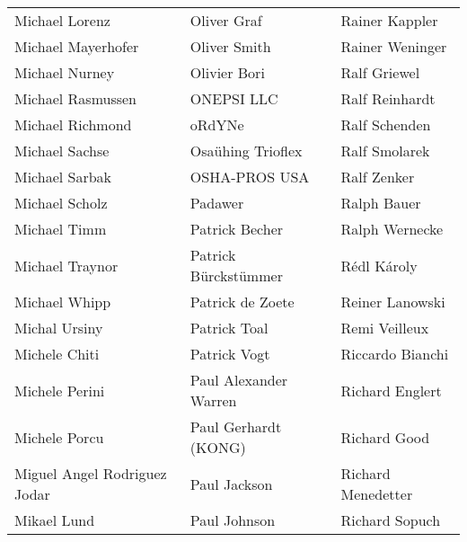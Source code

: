 \begin{tabular}{p{4.5cm}p{4.5cm}p{4.5cm}}
Michael Lorenz & Oliver Graf & Rainer Kappler \\
Michael Mayerhofer & Oliver Smith & Rainer Weninger \\
Michael Nurney & Olivier Bori & Ralf Griewel \\
Michael Rasmussen & ONEPSI LLC & Ralf Reinhardt \\
Michael Richmond & oRdYNe & Ralf Schenden \\
Michael Sachse & Osaühing Trioflex & Ralf Smolarek \\
Michael Sarbak & OSHA-PROS USA & Ralf Zenker \\
Michael Scholz & Padawer & Ralph Bauer \\
Michael Timm & Patrick Becher & Ralph Wernecke \\
Michael Traynor & Patrick Bürckstümmer & Rédl Károly \\
Michael Whipp & Patrick de Zoete & Reiner Lanowski \\
Michal Ursiny & Patrick Toal & Remi Veilleux \\
Michele Chiti & Patrick Vogt & Riccardo Bianchi \\
Michele Perini & Paul Alexander Warren & Richard Englert \\
Michele Porcu & Paul Gerhardt (KONG) & Richard Good \\
Miguel Angel Rodriguez Jodar & Paul Jackson & Richard Menedetter \\
Mikael Lund & Paul Johnson & Richard Sopuch \\
\end{tabular}
\newpage
\setlength{\tabcolsep}{1mm}
